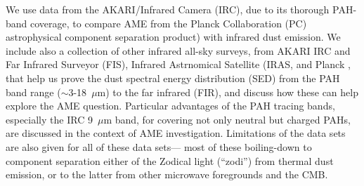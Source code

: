 \documentclass[12pt,a4paper]{article}
\begin{document}
 We use data from the AKARI/Infrared Camera (IRC), due to its thorough PAH-band coverage, to compare AME from the Planck Collaboration (PC) astrophysical component separation product) with infrared dust emission. 
 We include also a collection of other infrared all-sky surveys, from AKARI IRC and Far Infrared Surveyor (FIS), Infrared Astrnomical Satellite (IRAS,  and Planck , that help us prove the dust spectral energy distribution (SED) from the PAH band range ($\sim$3-18~$\mu$m) to the far infrared (FIR), and discuss how these can help explore the AME question. 
 Particular advantages of the PAH tracing bands, especially the IRC 9~$\mu$m band, for covering not only neutral but charged PAHs, are discussed in the context of AME investigation. 
 Limitations of the data sets are also given for all of these data sets--- most of these boiling-down to component separation either of the Zodical light (``zodi'') from thermal dust emission, or to the latter from other microwave foregrounds and the CMB.
\end{document}
